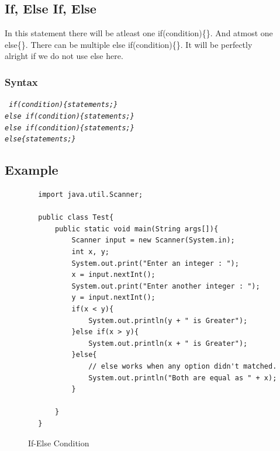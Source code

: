 \documentclass[openany]{book}  %
\begin{document}
\subsection{If, Else If, Else}
In this statement there will be atleast one if(condition)\{\}. And atmost one \\
else\{\}. There can be multiple else if(condition)\{\}. It will be perfectly \\
alright if we do not use else here.
% 
% 
\subsubsection{Syntax}
\begin{center}
    \tt{
        \textit{if(condition)\{statements;\}\\else if(condition)\{statements;\}\\else if(condition)\{statements;\}\\else\{statements;\}}
    }
\end{center}
% 
% 
\subsection{Example}
\begin{center}
    \begin{verbatim}
        import java.util.Scanner;

        public class Test{
            public static void main(String args[]){
                Scanner input = new Scanner(System.in);
                int x, y;
                System.out.print("Enter an integer : ");
                x = input.nextInt();
                System.out.print("Enter another integer : ");
                y = input.nextInt();
                if(x < y){
                    System.out.println(y + " is Greater");
                }else if(x > y){
                    System.out.println(x + " is Greater");
                }else{
                    // else works when any option didn't matched.
                    System.out.println("Both are equal as " + x);
                }

            }
        }
    \end{verbatim}
\end{center}
% 
% 
\begin{figure}[htbp]
    \begin{center}
        \caption{If-Else Condition}
    \end{center}
\end{figure}
% 
% 
\end{document}
